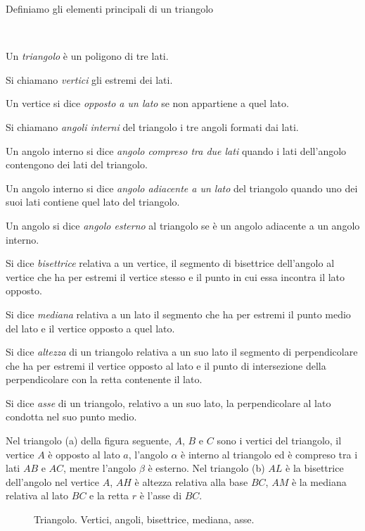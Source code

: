 Definiamo gli elementi principali di un triangolo
\begin{definizione}~
\begin{itemize*}
\item Un \emph{triangolo} è un poligono di tre lati.
\item Si chiamano \emph{vertici} gli estremi dei lati.
\item Un vertice si dice \emph{opposto a un lato} se non appartiene a 
quel lato.
\item Si chiamano \emph{angoli interni} del triangolo i tre angoli 
formati dai lati.
\item Un angolo interno si dice \emph{angolo compreso tra due lati} 
quando i lati dell'angolo contengono dei lati del triangolo.
\item Un angolo interno si dice \emph{angolo adiacente a un lato} del 
triangolo quando uno dei suoi lati contiene quel lato del triangolo.
\item Un angolo si dice \emph{angolo esterno} al triangolo se è un 
angolo adiacente a un angolo interno.
\item Si dice \emph{bisettrice} relativa a un vertice, il segmento di 
bisettrice dell'angolo al vertice che ha per estremi il vertice 
stesso e il punto in cui essa incontra il lato opposto.
\item Si dice \emph{mediana} relativa a un lato il segmento che ha 
per estremi il punto medio del lato e il vertice opposto a quel lato.
\item Si dice \emph{altezza} di un triangolo relativa a un suo lato 
il segmento di perpendicolare che ha per estremi il vertice opposto 
al lato e il punto di intersezione della perpendicolare con la retta 
contenente il lato. 
\item Si dice \emph{asse} di un triangolo, relativo a un suo lato, la 
perpendicolare al lato condotta nel suo punto medio.
\end{itemize*}
\end{definizione}

Nel triangolo (a) della figura seguente, \(A\), \(B\) e \(C\) sono i 
vertici del triangolo, il vertice \(A\) è opposto al lato \(a\), l'angolo 
\(\alpha\) è interno al triangolo ed è compreso tra i lati \(AB\) e \(AC\), 
mentre l'angolo \(\beta\) è esterno. Nel triangolo (b) \(AL\) è la 
bisettrice dell'angolo nel vertice \(A\), \(AH\) è altezza relativa alla 
base \(BC\), \(AM\) è la mediana relativa al lato \(BC\) e la retta \(r\) è 
l'asse di \(BC\).

\begin{inaccessibleblock}
 \begin{figure}[htb]
\centering
\caption{Triangolo. Vertici, angoli, bisettrice, mediana, asse.}
\label{fig:triangolo1}
\end{figure}
\end{inaccessibleblock}

